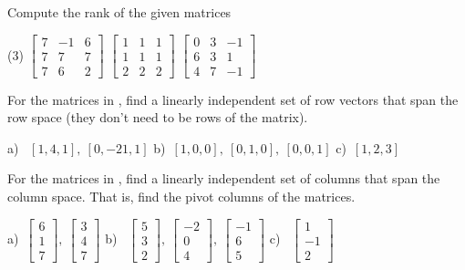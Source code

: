 \begin{exercise} \label{exercise:rankmatrixans}\ansMark%
Compute the rank of the given matrices
\begin{tasks}(3)
\task
$\begin{bmatrix}
7 & -1 & 6 \\
7 & 7 & 7 \\
7 & 6 & 2
\end{bmatrix}$
\task
$\begin{bmatrix}
1 & 1 & 1 \\
1 & 1 & 1 \\
2 & 2 & 2
\end{bmatrix}$
\task
$\begin{bmatrix}
0 & 3 & -1 \\
6 & 3 & 1 \\
4 & 7 & -1
\end{bmatrix}$
\end{tasks}
\end{exercise}


\begin{exercise}
For the matrices in , find
a linearly independent set of row vectors that span the row space
(they don't need to be rows of the matrix).
\end{exercise}
\comboSol{%
}
{%
a)~ $[1, 4, 1],\ [0, -21, 1]$ \quad b)~$[1,0,0],\ [0,1,0],\ [0,0,1]$ \quad c)~$[1,2,3]$
}

\begin{exercise}
For the matrices in , find
a linearly independent set of columns that span the column space.
That is, find the pivot columns of the matrices.
\end{exercise}
\comboSol{%
}
{%
a)~$\left[\begin{smallmatrix} 6 \\ 1 \\ 7 \end{smallmatrix}\right],\ \left[\begin{smallmatrix} 3 \\ 4 \\ 7 \end{smallmatrix}\right]$ \quad b)~ $\left[\begin{smallmatrix} 5 \\ 3 \\2 \end{smallmatrix}\right],\ \left[\begin{smallmatrix} -2 \\ 0 \\ 4 \end{smallmatrix}\right],\ \left[\begin{smallmatrix} -1 \\ 6 \\ 5 \end{smallmatrix}\right]$ \quad c)~ $\left[\begin{smallmatrix} 1 \\ -1 \\2 \end{smallmatrix}\right]$
}

